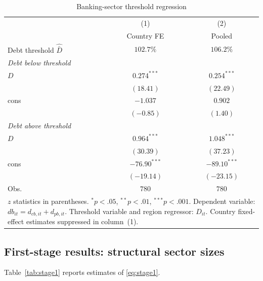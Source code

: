 \documentclass[\latexroot/\projectname]{subfiles}
\begin{document}
\begin{table}[htbp]\centering
\caption{Banking-sector threshold regression}
\label{tab:threshold}
\begin{tabular}{lcc}
\toprule
                              & (1)            & (2)            \\
                              & Country FE     & Pooled         \\
\midrule
Debt threshold $\hat{\bar D}$ & $102.7\%$      & $106.2\%$      \\
\midrule
\textit{Debt below threshold} & & \\
\quad $D$                     & $0.274^{***}$  & $0.254^{***}$  \\
                              & $(18.41)$      & $(22.49)$      \\
\quad cons                    & $-1.037$       & $0.902$        \\
                              & $(-0.85)$      & $(1.40)$       \\[2pt]
\textit{Debt above threshold} & & \\
\quad $D$                     & $0.964^{***}$  & $1.048^{***}$  \\
                              & $(30.39)$      & $(37.23)$      \\
\quad cons                    & $-76.90^{***}$ & $-89.10^{***}$ \\
                              & $(-19.14)$     & $(-23.15)$     \\
\midrule
Obs.                          & $780$          & $780$          \\
\bottomrule
\multicolumn{3}{p{0.7\linewidth}}{\footnotesize $z$ statistics in parentheses. $^{*}p<.05$, $^{**}p<.01$, $^{***}p<.001$. Dependent variable: $\mathit{db}_{it}=d_{cb,it}+d_{pb,it}$. Threshold variable and region regressor: $D_{it}$. Country fixed-effect estimates suppressed in column~(1).}
\end{tabular}
\end{table}

\subsection{First-stage results: structural sector sizes}

Table~\ref{tab:stage1} reports estimates of \eqref{eq:stage1}.
\end{document}
